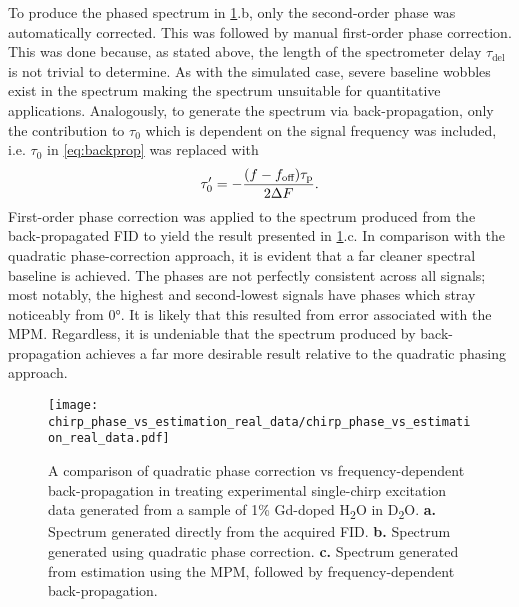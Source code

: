To produce the phased spectrum in \cref{fig:bbqchili-real}.b, only the
second-order phase was automatically corrected. This was followed by manual
first-order phase correction.  This was done because, as stated above, the
length of the spectrometer delay $\tau_{\text{del}}$ is not trivial to
determine. As with the simulated case, severe baseline wobbles exist in the
spectrum making the spectrum unsuitable for quantitative applications.
Analogously, to generate the spectrum via back-propagation, only the
contribution to $\tau_0$ which is dependent on the signal frequency was
included, i.e. $\tau_0$ in \cref{eq:backprop} was replaced with
\begin{equation}
    \tau_{0}^{\prime} = -\frac{(f - f_{\text{off}}) \tau_{\text{p}}}{2 \Delta F}.
\end{equation}
First-order phase correction was applied to the spectrum produced from the
back-propagated \ac{FID} to yield the result presented in
\cref{fig:bbqchili-real}.c.
In comparison with the quadratic phase-correction approach, it is evident that
a far cleaner spectral baseline is achieved. The phases are not perfectly
consistent across all signals; most notably, the highest and
second-lowest signals have phases which stray noticeably from \ang{0}. It is
likely that this resulted from error associated with the \ac{MPM}. Regardless,
it is undeniable that the spectrum produced by back-propagation achieves a far
more desirable result relative to the quadratic phasing approach.

\begin{figure}
    \centering
    \texttt{[image: chirp\_phase\_vs\_estimation\_real\_data/chirp\_phase\_vs\_estimation\_real\_data.pdf]}
    \caption[
        A comparison of quadratic phase correction vs frequency-dependent
        back-propagation in treating experimental single-chirp excitation data
        generated from a sample of Gd-doped H\textsubscript{2}O in
        D\textsubscript{2}O.
    ]{
        A comparison of quadratic phase correction vs frequency-dependent
        back-propagation in treating experimental single-chirp excitation data
        generated from a sample of 1\% Gd-doped H\textsubscript{2}O in
        D\textsubscript{2}O.
        \textbf{a.} Spectrum generated directly from the acquired \ac{FID}.
        \textbf{b.} Spectrum generated using quadratic phase correction.
        \textbf{c.} Spectrum generated from estimation using the \ac{MPM},
        followed by frequency-dependent back-propagation.
    }
    \label{fig:bbqchili-real}
\end{figure}
